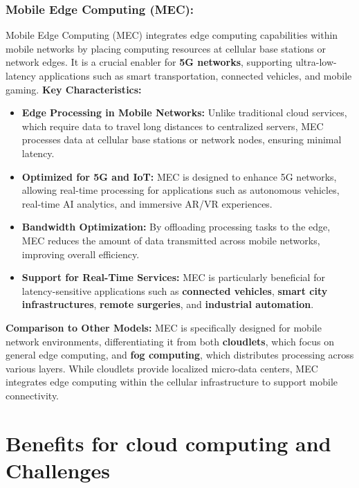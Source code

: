\documentclass[runningheads]{llncs}
\begin{document}
\subsubsection{Mobile Edge Computing (MEC):}
Mobile Edge Computing (MEC) integrates edge computing capabilities within mobile networks by placing computing resources at cellular base stations or network edges. It is a crucial enabler for \textbf{5G networks}, supporting ultra-low-latency applications such as smart transportation, connected vehicles, and mobile gaming.
\textbf{Key Characteristics:}
\begin{itemize}
    \item \textbf{Edge Processing in Mobile Networks:} Unlike traditional cloud services, which require data to travel long distances to centralized servers, MEC processes data at cellular base stations or network nodes, ensuring minimal latency.
    \item \textbf{Optimized for 5G and IoT:} MEC is designed to enhance 5G networks, allowing real-time processing for applications such as autonomous vehicles, real-time AI analytics, and immersive AR/VR experiences.
    \item \textbf{Bandwidth Optimization:} By offloading processing tasks to the edge, MEC reduces the amount of data transmitted across mobile networks, improving overall efficiency.
    \item \textbf{Support for Real-Time Services:} MEC is particularly beneficial for latency-sensitive applications such as \textbf{connected vehicles}, \textbf{smart city infrastructures}, \textbf{remote surgeries}, and \textbf{industrial automation}.
\end{itemize}

\textbf{Comparison to Other Models:}  
MEC is specifically designed for mobile network environments, differentiating it from both \textbf{cloudlets}, which focus on general edge computing, and \textbf{fog computing}, which distributes processing across various layers. While cloudlets provide localized micro-data centers, MEC integrates edge computing within the cellular infrastructure to support mobile connectivity.


\section{Benefits for cloud computing and Challenges}
\end{document}
